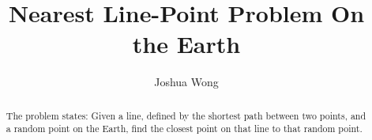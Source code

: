 \documentclass[a4paper,10pt]{article}
\title{Nearest Line-Point Problem On the Earth}
\author{Joshua Wong}
\begin{document}
\maketitle

\begin{abstract}
The problem states: Given a line, defined by the shortest path between two points, and a random point on the Earth, find the closest point on that line to that random point.
\end{abstract}

\section{}
\end{document}
